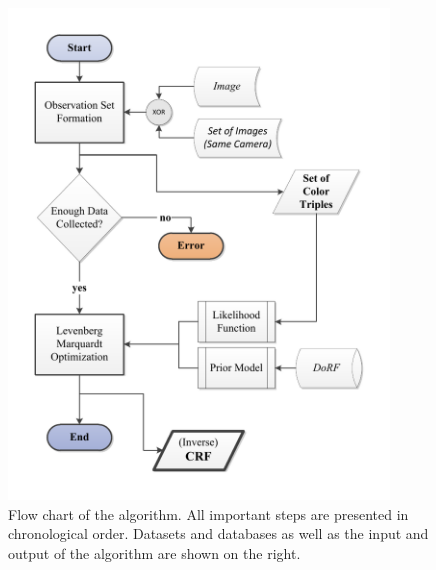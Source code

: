 \begin{figure}[htbp]
	\centering
	\includegraphics[width=0.9\textwidth]{images/radcal_overview.pdf}
	\caption[Flow chart (Radiometric Calibration)]{Flow chart of the algorithm. All important steps are presented in chronological order. Datasets and databases as well as the input and output of the algorithm are shown on the right.}
	\label{fig:radcaloverview}
\end{figure}

